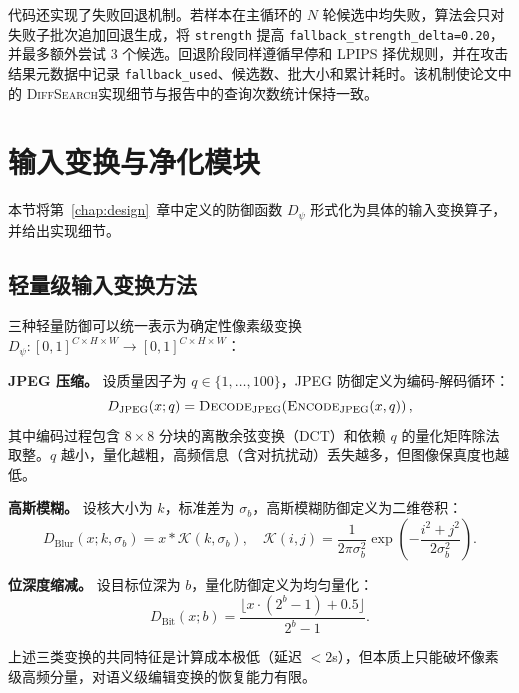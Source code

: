 \documentclass[type=bachelor,oneside]{fduthesis}
\newcommand{\methodname}{\textsc{DiffSearch}}
\begin{document}
代码还实现了失败回退机制。若样本在主循环的 $N$ 轮候选中均失败，算法会只对失败子批次追加回退生成，将 \texttt{strength} 提高 \texttt{fallback\_\allowbreak strength\_\allowbreak delta=0.20}，并最多额外尝试 3 个候选。回退阶段同样遵循早停和 LPIPS 择优规则，并在攻击结果元数据中记录 \texttt{fallback\_\allowbreak used}、候选数、批大小和累计耗时。该机制使论文中的 \methodname 实现细节与报告中的查询次数统计保持一致。

\section{输入变换与净化模块}

本节将第~\ref{chap:design}~章中定义的防御函数 $D_\psi$ 形式化为具体的输入变换算子，并给出实现细节。

\subsection{轻量级输入变换方法}

三种轻量防御可以统一表示为确定性像素级变换 $D_\psi: [0,1]^{C\times H\times W} \to [0,1]^{C\times H\times W}$：

\textbf{JPEG 压缩。} 设质量因子为 $q \in \{1,\ldots,100\}$，JPEG 防御定义为编码-解码循环：
\begin{equation}
  D_{\text{JPEG}}(x; q) = \textsc{Decode}_{\text{JPEG}}\!\left(\textsc{Encode}_{\text{JPEG}}(x, q)\right),
  \label{eq:defense_jpeg}
\end{equation}
其中编码过程包含 $8{\times}8$ 分块的离散余弦变换（DCT）和依赖 $q$ 的量化矩阵除法取整。$q$ 越小，量化越粗，高频信息（含对抗扰动）丢失越多，但图像保真度也越低。

\textbf{高斯模糊。} 设核大小为 $k$，标准差为 $\sigma_b$，高斯模糊防御定义为二维卷积：
\begin{equation}
  D_{\text{Blur}}(x; k, \sigma_b) = x * \mathcal{K}(k, \sigma_b), \quad \mathcal{K}(i,j) = \frac{1}{2\pi\sigma_b^2}\exp\!\left(-\frac{i^2+j^2}{2\sigma_b^2}\right).
  \label{eq:defense_blur}
\end{equation}

\textbf{位深度缩减。} 设目标位深为 $b$，量化防御定义为均匀量化：
\begin{equation}
  D_{\text{Bit}}(x; b) = \frac{\lfloor x \cdot (2^b - 1) + 0.5 \rfloor}{2^b - 1}.
  \label{eq:defense_bit}
\end{equation}

上述三类变换的共同特征是计算成本极低（延迟 $<2$s），但本质上只能破坏像素级高频分量，对语义级编辑变换的恢复能力有限。
\end{document}
